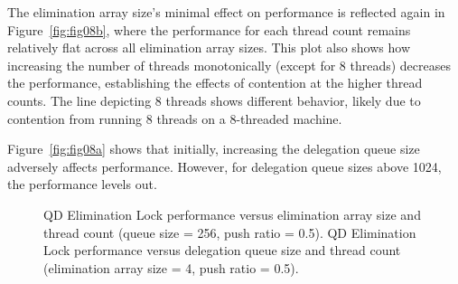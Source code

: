 The elimination array size's minimal effect on performance is reflected again in Figure~\ref{fig:fig08b}, where the performance for each thread count remains relatively flat across all elimination array sizes. This plot also shows how increasing the number of threads monotonically (except for 8 threads) decreases the performance, establishing the effects of contention at the higher thread counts. The line depicting 8 threads shows different behavior, likely due to contention from running 8 threads on a 8-threaded machine.

Figure~\ref{fig:fig08a} shows that initially, increasing the delegation queue size adversely affects performance. However, for delegation queue sizes above 1024, the performance levels out.

\begin{figure}[]
\centering
{}
\caption[]{ QD Elimination Lock performance versus elimination array size and thread count (queue size = 256, push ratio = 0.5).  QD Elimination Lock performance versus delegation queue size and thread count (elimination array size = 4, push ratio = 0.5).}
\label{fig:qdsize_and_thrd}
\end{figure}
